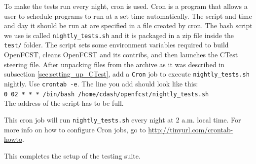 To make the tests run every night, cron is used. Cron is a program that allows a user to schedule programs to run at a set time automatically. The script and time and day it should be run at are specified in a file created by cron. The bash script we use is called \verb!nightly_tests.sh! and it is packaged in a zip file inside the \verb!test/! folder. The script sets some environment variables required to build OpenFCST, cleans OpenFCST and its contribs, and then launches the CTest steering file. After unpacking files from the archive as it was described in subsection \ref{sec:setting_up_CTest},  add a \verb!Cron! job to execute \verb!nightly_tests.sh! nightly. Use \verb!crontab -e!. The line you add should look like this:\\

\verb!0 02 * * * /bin/bash /home/cdash/openfcst/nightly_tests.sh!\\
 
The address of the script has to be full.

This cron job will run \verb!nightly_tests.sh! every night at 2 a.m. local time. For more info on how to configure Cron jobs, go to \url{http://tinyurl.com/crontab-howto}.

This completes the setup of the testing suite.

